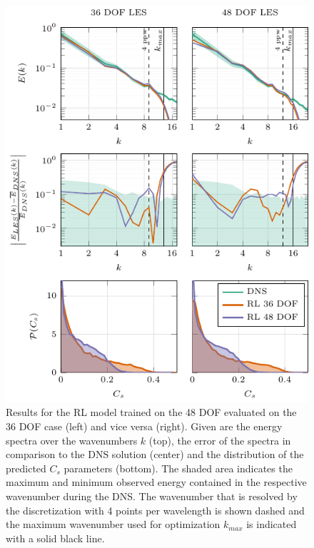 \begin{figure}
  \centering
  \includegraphics[width=0.99\linewidth]{tikz_double_column/draft-figure5.pdf}
  \caption{Results for the RL model trained on the 48 DOF evaluated on the 36 DOF case (left) and vice versa (right). Given are the energy spectra over the wavenumbers $k$ (top), the error of the spectra in comparison to the DNS solution (center) and the distribution of the predicted $C_s$ parameters (bottom). The shaded area indicates the maximum and minimum observed energy contained in the respective wavenumber during the DNS. The wavenumber that is resolved by the discretization with 4 points per wavelength is shown dashed and the maximum wavenumber used for optimization $k_{max}$ is indicated with a solid black line.}
  \label{fig:generalization_resolution}
\end{figure}

